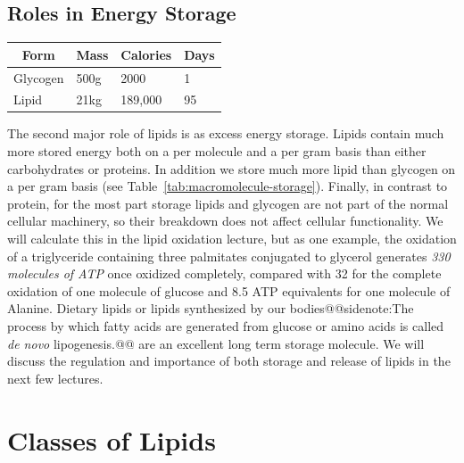 \documentclass{tufte-handout}
\makeatletter
\def\sidenote#1{@@sidenote:#1@@}
\makeatother
\begin{document}
\subsection{Roles in Energy Storage}

\begin{margintable}
\centering
\caption{Total energy stored as glycogen and lipid in a typical person.  Mass is the total amount of this storage fuel, converted to calories using Atwater factors.  Days indicates how many days worth of TDEE that can be supported by this number of calories.  Calculation is based on a 75kg person with 28\% body fat and a TDEE of 2000 Calories/day.}\label{tab:macromolecule-storage}
\begin{tabular}{llll}
\hline
\multicolumn{1}{c}{\textbf{Form}} & \textbf{Mass} & \textbf{Calories} & \textbf{Days} \\ \hline
Glycogen & 500g & 2000 & 1 \\
Lipid & 21kg & 189,000 & 95 \\
\end{tabular}
\end{margintable}

The second major role of lipids is as excess energy storage.  Lipids contain much more stored energy both on a per molecule and a per gram basis than either carbohydrates or proteins.  In addition we store much more lipid than glycogen on a per gram basis (see Table~\ref{tab:macromolecule-storage}).  Finally, in contrast to protein, for the most part storage lipids and glycogen are not part of the normal cellular machinery, so their breakdown does not affect cellular functionality.  We will calculate this in the lipid oxidation lecture, but as one example, the oxidation of a triglyceride containing three palmitates conjugated to glycerol generates \emph{330 molecules of ATP} once oxidized completely, compared with 32 for the complete oxidation of one molecule of glucose and 8.5 ATP equivalents for one molecule of Alanine. Dietary lipids or lipids synthesized by our bodies\sidenote{The process by which fatty acids are generated from glucose or amino acids is called \textit{de novo} lipogenesis.} are an excellent long term storage molecule.  We will discuss the regulation and importance of both storage and release of lipids in the next few lectures.

\section{Classes of Lipids}
\end{document}
